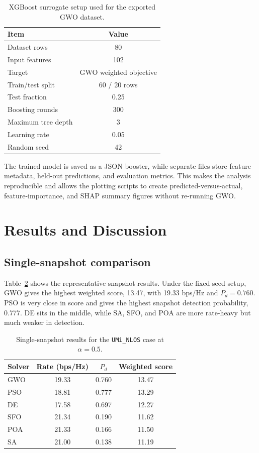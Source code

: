 \documentclass[runningheads]{llncs}
\begin{document}
\begin{table}[t]
\centering
\caption{XGBoost surrogate setup used for the exported GWO dataset.}
\label{tab:xgboostsetup}
\small
\begin{tabular}{lc}
\toprule
Item & Value \\
\midrule
Dataset rows & 80 \\
Input features & 102 \\
Target & GWO weighted objective \\
Train/test split & 60 / 20 rows \\
Test fraction & 0.25 \\
Boosting rounds & 300 \\
Maximum tree depth & 3 \\
Learning rate & 0.05 \\
Random seed & 42 \\
\bottomrule
\end{tabular}
\end{table}

The trained model is saved as a JSON booster, while separate files store feature metadata, held-out predictions, and evaluation metrics. This makes the analysis reproducible and allows the plotting scripts to create predicted-versus-actual, feature-importance, and SHAP summary figures without re-running GWO.

\section{Results and Discussion}

\subsection{Single-snapshot comparison}
Table~\ref{tab:static} shows the representative snapshot results. Under the fixed-seed setup, GWO gives the highest weighted score, 13.47, with 19.33 bps/Hz and $P_d=0.760$. PSO is very close in score and gives the highest snapshot detection probability, 0.777. DE sits in the middle, while SA, SFO, and POA are more rate-heavy but much weaker in detection.

\begin{table}[t]
\centering
\caption{Single-snapshot results for the \texttt{UMi\_NLOS} case at $\alpha=0.5$.}
\label{tab:static}
\begin{tabular}{lccc}
\toprule
Solver & Rate (bps/Hz) & $P_d$ & Weighted score \\
\midrule
GWO & 19.33 & 0.760 & 13.47 \\
PSO & 18.81 & 0.777 & 13.29 \\
DE  & 17.58 & 0.697 & 12.27 \\
SFO & 21.34 & 0.190 & 11.62 \\
POA & 21.33 & 0.166 & 11.50 \\
SA  & 21.00 & 0.138 & 11.19 \\
\bottomrule
\end{tabular}
\end{table}
\end{document}
